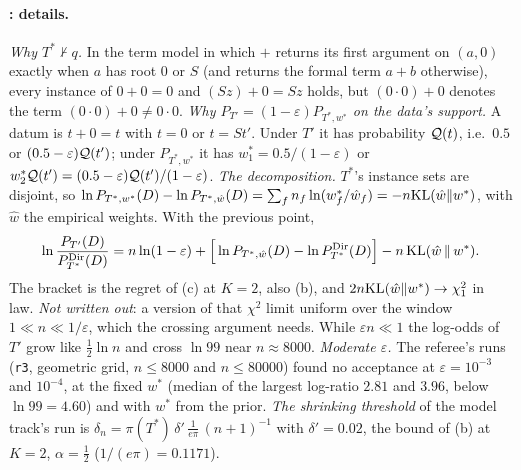 \paragraph{: details.} \emph{Why $T^*\nvdash q$.} In the term model in which $+$ returns its first argument on $(a,0)$ exactly when $a$ has root $0$ or $S$ (and returns the formal term $a+b$ otherwise), every instance of $0+0=0$ and $(Sz)+0=Sz$ holds, but $(0\cdot0)+0$ denotes the term $(0\cdot0)+0\ne0\cdot0$. \emph{Why $P_{T'}=(1-\varepsilon)P_{T^*,w^*}$ on the data's support.} A datum is $t+0=t$ with $t=0$ or $t=St'$. Under $T'$ it has probability $\mathcal{Q}(t)$, i.e.\ $0.5$ or $(0.5-\varepsilon)\mathcal{Q}(t')$; under $P_{T^*,w^*}$ it has $w^*_1=0.5/(1-\varepsilon)$ or $w^*_2\mathcal{Q}(t')=(0.5-\varepsilon)\mathcal{Q}(t')/(1-\varepsilon)$. \emph{The decomposition.} $T^*$'s instance sets are disjoint, so $\ln P_{T^*,w^*}(D)-\ln P_{T^*,\hat w}(D)=\sum_fn_f\ln(w^*_f/\hat w_f)=-n\mathrm{KL}(\hat w\|w^*)$, with $\hat w$ the empirical weights. With the previous point,
\[
\ln\frac{P_{T'}(D)}{P^{\mathrm{Dir}}_{T^*}(D)}=n\ln(1-\varepsilon)+\Big[\ln P_{T^*,\hat w}(D)-\ln P^{\mathrm{Dir}}_{T^*}(D)\Big]-n\,\mathrm{KL}(\hat w\,\|\,w^*).
\]
The bracket is the regret of (c) at $K=2$, also (b), and $2n\mathrm{KL}(\hat w\|w^*)\to\chi^2_1$ in law. \emph{Not written out}: a version of that $\chi^2$ limit uniform over the window $1\ll n\ll1/\varepsilon$, which the crossing argument needs. While $\varepsilon n\ll1$ the log-odds of $T'$ grow like $\tfrac12\ln n$ and cross $\ln99$ near $n\approx8000$. \emph{Moderate $\varepsilon$.} The referee's runs (\texttt{r3}, geometric grid, $n\le8000$ and $n\le80000$) found no acceptance at $\varepsilon=10^{-3}$ and $10^{-4}$, at the fixed $w^*$ (median of the largest log-ratio $2.81$ and $3.96$, below $\ln99=4.60$) and with $w^*$ from the prior. \emph{The shrinking threshold} of the model track's run is $\delta_n=\pi(T^*)\,\delta'\,\frac{1}{e\pi}\,(n+1)^{-1}$ with $\delta'=0.02$, the bound of (b) at $K=2$, $\alpha=\tfrac12$ ($1/(e\pi)=0.1171$).

